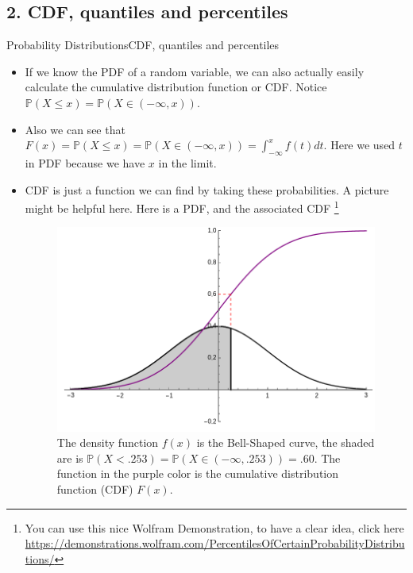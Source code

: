 \documentclass[8pt, usepdftitle = false]{beamer}
\begin{document}
\subsection{2. CDF, quantiles and percentiles}
\frame{\subsectionpage}




\begin{frame}[allowframebreaks]{Probability Distributions}{CDF, quantiles and percentiles}

\begin{itemize}
\item  If we know the PDF of a random variable, we can also actually easily calculate the cumulative distribution function or CDF. Notice $\mathbb{P}(X \leq x) = \mathbb{P}(X \in (-\infty, x) )$.

\item Also we can see that $F(x) = \mathbb{P}(X \leq x) = \mathbb{P}(X \in (-\infty, x) ) = \int_{-\infty}^{x} f(t) dt$. Here we used $t$ in PDF because we have $x$ in the limit.

\item CDF is just a function we can find by taking these probabilities. A picture might be helpful here. Here is a PDF, and the associated CDF \footnote[frame]{You can use this nice Wolfram Demonstration, to have a clear idea, click here \url{https://demonstrations.wolfram.com/PercentilesOfCertainProbabilityDistributions/}}

\begin{figure}
\centering
\includegraphics[scale = .25]{Images/PDF_CDF.png}
\caption{The density function $f(x)$ is the Bell-Shaped curve, the shaded are is $\mathbb{P}(X < .253) = \mathbb{P}(X \in (-\infty, .253)) = .60$. The function in the purple color is the cumulative distribution function (CDF) $F(x)$.}
\end{figure}


\end{itemize}
\end{frame}
\end{document}

